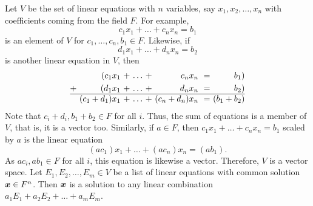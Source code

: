 \begin{Exam}\label{exam:vectorspaceproof} Let $V$ be the set of linear equations with $n$ variables, say $x_1, x_2,\ldots, x_n$ with coefficients coming from the field $F$.  For example, 
\[c_1x_1+\ldots + c_nx_n = b_1\] is an element of $V$ for $c_1,\ldots, c_n, b_1\in F$. Likewise, if \[d_1x_1+\ldots + d_nx_n=b_2\] is another linear equation in $V$, then 
\[\begin{alignedat}{100}
&& (c_1x_1\ &+\ & \ldots\ & +\ & c_nx_n\ & =\ & b_1) \\
+\ && (d_1x_1\ &+\ &\ldots\ & +\ & d_nx_n\ &=\ &b_2)\\ \hline
&&(c_1+d_1)x_1\ &+\ & \ldots\ & +\ & (c_n+d_n)x_n\ & =\ & (b_1+b_2)
\end{alignedat}\] Note that $c_i+d_i, b_1+b_2\in F$ for all $i$. Thus, the sum of equations is a member of $V$, that is, it is a vector too. Similarly, if $a\in F$, then $c_1x_1+\ldots + c_nx_n = b_1$ scaled by $a$ is the linear equation 
 \[(ac_1)x_1+\ldots + (ac_n)x_n = (ab_1).\] As $ac_i, ab_1\in F$ for all $i$, this equation is likewise a vector. Therefore, $V$ is a vector space. Let $E_1, E_2, \ldots, E_m \in V$ be a list of linear equations with common solution $\boldsymbol x \in F^n$. Then $\boldsymbol x$ is a solution to any linear combination $a_1E_1 + a_2E_2 +\ldots + a_mE_m$. 
\end{Exam}\vs

